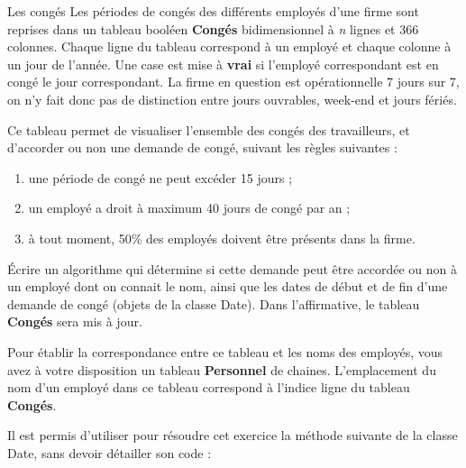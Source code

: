 \begin{Exercice}{Les congés}
	Les périodes de congés des différents employés d’une firme sont reprises
	dans un tableau booléen \textbf{Congés} bidimensionnel à \textit{n}
	lignes et 366 colonnes. Chaque ligne du tableau correspond à un employé
	et chaque colonne à un jour de l’année. Une case est mise
	à \textbf{vrai} si l’employé correspondant est en congé le jour
	correspondant. La firme en question est opérationnelle 7 jours sur 7,
	on n’y fait donc pas de distinction entre jours ouvrables, week-end et
	jours fériés.

	Ce tableau permet de visualiser l’ensemble des congés des travailleurs,
	et d’accorder ou non une demande de congé, suivant les règles suivantes :
	\begin{enumerate}
		\item 
			une période de congé ne peut excéder 15 jours ;
		\item 
			un employé a droit à maximum 40 jours de congé par an ;
		\item 
			à tout moment, 50\% des employés doivent être présents dans la firme.
	\end{enumerate}
	
	Écrire un algorithme qui détermine si cette demande peut être accordée
	ou non à un employé dont on connait le nom, ainsi que les dates de
	début et de fin d’une demande de congé (objets de la classe Date). Dans
	l’affirmative, le tableau \textbf{Congés} sera mis à jour.

	Pour établir la correspondance entre ce tableau et les noms des
	employés, vous avez à votre disposition un tableau \textbf{Personnel}
	de chaines. L’emplacement du nom d’un employé dans ce tableau
	correspond à l’indice ligne du tableau \textbf{Congés}.

	Il est permis d’utiliser pour résoudre cet exercice la méthode suivante
	de la classe Date, sans devoir détailler son code :
	
	\begin{algo}
	\end{algo}
\end{Exercice}

